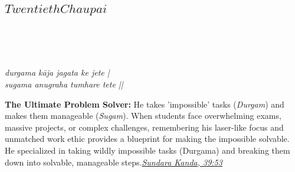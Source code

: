 
\newpage

\subsection*{ \(Twentieth Chaupai\)}

\begin{minipage}[t]{0.55\textwidth}
\vspace{0pt}

{\large \linespread{1.5}\selectfont
{}\\
\par}

\vspace{0.5em}

{\large \linespread{1.5}\selectfont
{}\\
\par}

\vspace{0.5em}

{\large \linespread{1.3}\selectfont
\textit{durgama kāja jagata ke jete |}\\
\textit{sugama anugraha tumhare tete ||}
\par}
\end{minipage}%
\hfill
\begin{minipage}[t]{0.42\textwidth}
\vspace{0pt}
\begin{tcolorbox}[anchorbox]
\textbf{The Ultimate Problem Solver:} He takes 'impossible' tasks (\textit{Durgam}) and makes them manageable (\textit{Sugam}). When students face overwhelming exams, massive projects, or complex challenges, remembering his laser-like focus and unmatched work ethic provides a blueprint for making the impossible solvable.
\vspace{0.5em}\newline He specialized in taking wildly impossible tasks (Durgama) and breaking them down into solvable, manageable steps.\newline\null\hfill\href{https://www.valmiki.iitk.ac.in/sloka?field_kanda_tid=5&language=dv&field_sarga_value=39}{\textit{Sundara Kanda, 39:53}}
\end{tcolorbox}
\end{minipage}


